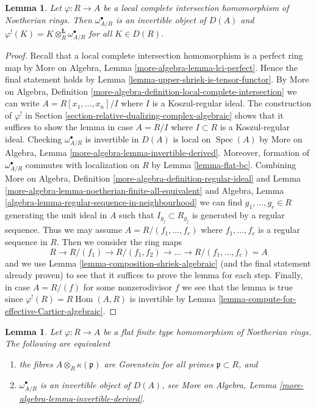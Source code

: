 \documentclass{stacks-project}
\theoremstyle{plain}
\newtheorem{lemma}[subsection]{Lemma}
\theoremstyle{definition}
\theoremstyle{remark}
\numberwithin{equation}{subsection}
\def\Spec{\mathop{\mathrm{Spec}}}
\def\Hom{\mathop{\mathrm{Hom}}\nolimits}
\begin{document}
\begin{lemma}
\label{lemma-lci-shriek}
Let $\varphi : R \to A$ be a local complete intersection homomorphism of
Noetherian rings. Then $\omega_{A/R}^\bullet$ is an invertible object of
$D(A)$ and $\varphi^!(K) = K \otimes_R^\mathbf{L} \omega_{A/R}^\bullet$
for all $K \in D(R)$.
\end{lemma}

\begin{proof}
Recall that a local complete intersection homomorphism is a perfect
ring map by More on Algebra, Lemma \ref{more-algebra-lemma-lci-perfect}.
Hence the final statement holds by
Lemma \ref{lemma-upper-shriek-is-tensor-functor}.
By More on Algebra, Definition
\ref{more-algebra-definition-local-complete-intersection}
we can write $A = R[x_1, \ldots, x_n]/I$ where $I$ is a
Koszul-regular ideal.
The construction of $\varphi^!$ in
Section \ref{section-relative-dualizing-complex-algebraic}
shows that it suffices to show the lemma in case
$A = R/I$ where $I \subset R$ is a Koszul-regular ideal.
Checking $\omega_{A/R}^\bullet$ is invertible in $D(A)$
is local on $\Spec(A)$ by More on Algebra, Lemma
\ref{more-algebra-lemma-invertible-derived}.
Moreover, formation of $\omega_{A/R}^\bullet$ commutes with
localization on $R$ by Lemma \ref{lemma-flat-bc}.
Combining
More on Algebra, Definition \ref{more-algebra-definition-regular-ideal} and
Lemma \ref{more-algebra-lemma-noetherian-finite-all-equivalent} and
Algebra, Lemma \ref{algebra-lemma-regular-sequence-in-neighbourhood}
we can find $g_1, \ldots, g_r \in R$ generating the unit ideal in $A$
such that $I_{g_j} \subset R_{g_j}$ is generated by a regular sequence.
Thus we may assume $A = R/(f_1, \ldots, f_c)$ where $f_1, \ldots, f_c$
is a regular sequence in $R$. Then we consider the ring maps
$$
R \to R/(f_1) \to R/(f_1, f_2) \to \ldots \to R/(f_1, \ldots, f_c) = A
$$
and we use Lemma \ref{lemma-composition-shriek-algebraic}
(and the final statement already proven)
to see that it suffices to prove the lemma for each step.
Finally, in case $A = R/(f)$ for some nonzerodivisor $f$
we see that the lemma is true since $\varphi^!(R) = R\Hom(A, R)$
is invertible by Lemma \ref{lemma-compute-for-effective-Cartier-algebraic}.
\end{proof}

\begin{lemma}
\label{lemma-gorenstein-shriek}
Let $\varphi : R \to A$ be a flat finite type homomorphism of Noetherian rings.
The following are equivalent
\begin{enumerate}
\item the fibres $A \otimes_R \kappa(\mathfrak p)$ are Gorenstein
for all primes $\mathfrak p \subset R$, and
\item $\omega_{A/R}^\bullet$ is an invertible object of $D(A)$, see
More on Algebra, Lemma \ref{more-algebra-lemma-invertible-derived}.
\end{enumerate}
\end{lemma}
\end{document}
